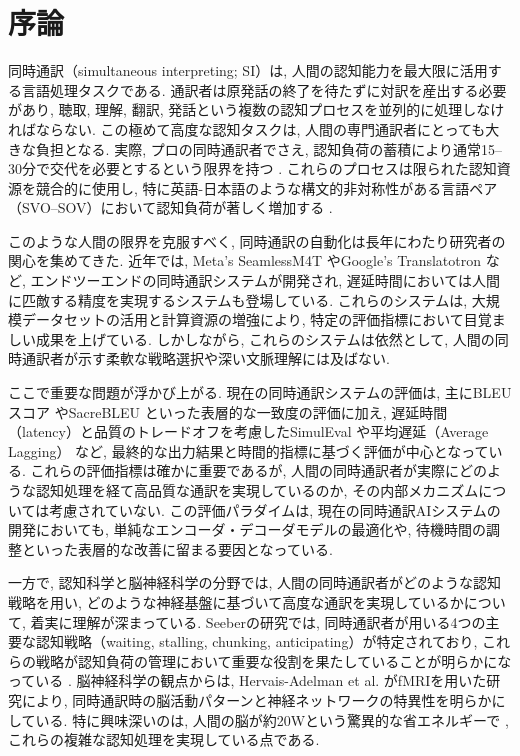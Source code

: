 \section{序論}

同時通訳（simultaneous interpreting; SI）は, 人間の認知能力を最大限に活用する言語処理タスクである. 
通訳者は原発話の終了を待たずに対訳を産出する必要があり, 聴取, 理解, 翻訳, 発話という複数の認知プロセスを並列的に処理しなければならない. 
この極めて高度な認知タスクは, 人間の専門通訳者にとっても大きな負担となる. 
実際, プロの同時通訳者でさえ, 認知負荷の蓄積により通常15--30分で交代を必要とするという限界を持つ \cite{gile1995regards}. 
これらのプロセスは限られた認知資源を競合的に使用し, 特に英語-日本語のような構文的非対称性がある言語ペア（SVO--SOV）において認知負荷が著しく増加する \cite{seeber2011cognitive}. 

このような人間の限界を克服すべく, 同時通訳の自動化は長年にわたり研究者の関心を集めてきた. 
近年では, Meta's SeamlessM4T \cite{barrault2023seamlessm4t} やGoogle's Translatotron \cite{jia2019direct} など, エンドツーエンドの同時通訳システムが開発され, 遅延時間においては人間に匹敵する精度を実現するシステムも登場している. 
これらのシステムは, 大規模データセットの活用と計算資源の増強により, 特定の評価指標において目覚ましい成果を上げている. 
しかしながら, これらのシステムは依然として, 人間の同時通訳者が示す柔軟な戦略選択や深い文脈理解には及ばない. 

ここで重要な問題が浮かび上がる. 
現在の同時通訳システムの評価は, 主にBLEUスコア \cite{papineni2002bleu} やSacreBLEU \cite{post2018call} といった表層的な一致度の評価に加え, 遅延時間（latency）と品質のトレードオフを考慮したSimulEval \cite{ma2020simuleval} や平均遅延（Average Lagging） \cite{ma2019stacl} など, 最終的な出力結果と時間的指標に基づく評価が中心となっている. 
これらの評価指標は確かに重要であるが, 人間の同時通訳者が実際にどのような認知処理を経て高品質な通訳を実現しているのか, その内部メカニズムについては考慮されていない. 
この評価パラダイムは, 現在の同時通訳AIシステムの開発においても, 単純なエンコーダ・デコーダモデルの最適化や, 待機時間の調整といった表層的な改善に留まる要因となっている. 

一方で, 認知科学と脳神経科学の分野では, 人間の同時通訳者がどのような認知戦略を用い, どのような神経基盤に基づいて高度な通訳を実現しているかについて, 着実に理解が深まっている. 
Seeberの研究では, 同時通訳者が用いる4つの主要な認知戦略（waiting, stalling, chunking, anticipating）が特定されており, これらの戦略が認知負荷の管理において重要な役割を果たしていることが明らかになっている \cite{seeber2011cognitive}. 
脳神経科学の観点からは, Hervais-Adelman et al. \cite{hervais2017cortical} がfMRIを用いた研究により, 同時通訳時の脳活動パターンと神経ネットワークの特異性を明らかにしている. 
特に興味深いのは, 人間の脳が約20Wという驚異的な省エネルギーで \cite{clarke2008energy}, これらの複雑な認知処理を実現している点である. 

